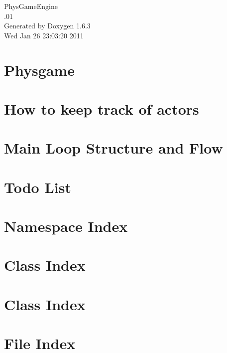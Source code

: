 \documentclass[a4paper]{book}
\begin{document}
\hypersetup{pageanchor=false}
\begin{titlepage}
\vspace*{7cm}
\begin{center}
{\Large PhysGameEngine \\[1ex]\large .01 }\\
\vspace*{1cm}
{\large Generated by Doxygen 1.6.3}\\
\vspace*{0.5cm}
{\small Wed Jan 26 23:03:20 2011}\\
\end{center}
\end{titlepage}
\clearemptydoublepage
{}
\tableofcontents
\clearemptydoublepage
{}
\hypersetup{pageanchor=true}
\chapter{Physgame}
\label{index}\hypertarget{index}{}
\chapter{How to keep track of actors}
\label{actorcontainer1}
\hypertarget{actorcontainer1}{}

\chapter{Main Loop Structure and Flow}
\label{mainloop1}
\hypertarget{mainloop1}{}

\chapter{Todo List}
\label{todo}
\hypertarget{todo}{}

\chapter{Namespace Index}

\chapter{Class Index}

\chapter{Class Index}

\chapter{File Index}

\end{document}
